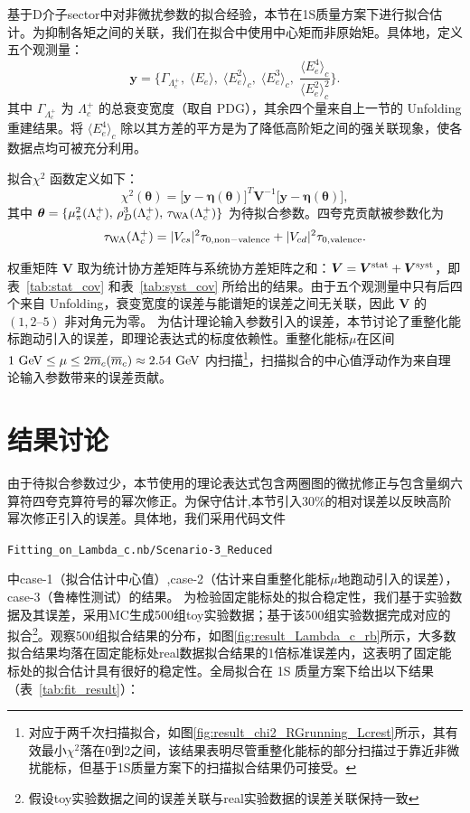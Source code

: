 基于D介子sector中对非微扰参数的拟合经验，本节在1S质量方案下进行拟合估计。为抑制各矩之间的关联，我们在拟合中使用中心矩而非原始矩。具体地，定义五个观测量：
\begin{equation}
\boldsymbol{y} = \Big\{ \Gamma_{\Lambda_c^+},\; \langle E_e\rangle,\; \langle E_e^2\rangle_c,\; \langle E_e^3\rangle_c,\; \frac{\langle E_e^4\rangle_c}{\langle E_e^2\rangle_c^2} \Big\} .
\end{equation}
其中 $\Gamma_{\Lambda_c^+}$ 为 $\Lambda_c^+$ 的总衰变宽度（取自 PDG），其余四个量来自上一节的 Unfolding 重建结果。将 $\langle E_e^4\rangle_c$ 除以其方差的平方是为了降低高阶矩之间的强关联现象，使各数据点均可被充分利用。


拟合$\chi^2$ 函数定义如下：
\begin{equation}\label{eq:chi2}
\chi^2(\boldsymbol{\theta}) = \bigl[\boldsymbol{y} - \boldsymbol{\eta}(\boldsymbol{\theta})\bigr]^T \boldsymbol{V}^{-1} \bigl[\boldsymbol{y} - \boldsymbol{\eta}(\boldsymbol{\theta})\bigr] ,
\end{equation}
其中 $\boldsymbol{\theta} = \{\mu_\pi^2(\Lambda_c^+),\, \rho_D^3(\Lambda_c^+),\, \tau_{\rm WA}(\Lambda_c^+)\}$ 为待拟合参数。四夸克贡献被参数化为
\begin{equation}
\tau_{\rm WA}(\Lambda_c^+) = |V_{cs}|^2 \tau_{0,\rm non-valence} + |V_{cd}|^2 \tau_{0,\rm valence} .
\end{equation}

权重矩阵 $\boldsymbol{V}$ 取为统计协方差矩阵与系统协方差矩阵之和：$\boldsymbol{V} = \boldsymbol{V}^{\rm stat} + \boldsymbol{V}^{\rm syst}$，即表~\ref{tab:stat_cov} 和表~\ref{tab:syst_cov} 所给出的结果。由于五个观测量中只有后四个来自 Unfolding，衰变宽度的误差与能谱矩的误差之间无关联，因此 $\boldsymbol{V}$ 的 $(1,2\text{--}5)$ 非对角元为零。
为估计理论输入参数引入的误差，本节讨论了重整化能标跑动引入的误差，即理论表达式的标度依赖性。重整化能标$\mu$在区间 $1~\mathrm{GeV} \le \mu \le 2\overline{m}_c(\overline{m}_c) \approx 2.54~\mathrm{GeV}$ 内扫描\footnote{对应于两千次扫描拟合，如图\ref{fig:result_chi2_RGrunning_Lcrest}所示，其有效最小$\chi^2$落在0到2之间，该结果表明尽管重整化能标的部分扫描过于靠近非微扰能标，但基于1S质量方案下的扫描拟合结果仍可接受。}，扫描拟合的中心值浮动作为来自理论输入参数带来的误差贡献。
\section{结果讨论}\label{sec:discussion}
由于待拟合参数过少，本节使用的理论表达式包含两圈图的微扰修正与包含量纲六算符四夸克算符号的幂次修正。为保守估计,本节引入$30\%$的相对误差以反映高阶幂次修正引入的误差。具体地，我们采用代码文件
\begin{center}
    \verb|Fitting_on_Lambda_c.nb/Scenario-3_Reduced|
\end{center}
中case-1（拟合估计中心值）,case-2（估计来自重整化能标$\mu$地跑动引入的误差），case-3（鲁棒性测试）的结果。 为检验固定能标处的拟合稳定性，我们基于实验数据及其误差，采用MC生成500组toy实验数据；基于该500组实验数据完成对应的拟合\footnote{假设toy实验数据之间的误差关联与real实验数据的误差关联保持一致}。观察500组拟合结果的分布，如图\ref{fig:result_Lambda_c_rb}所示，大多数拟合结果均落在固定能标处real数据拟合结果的1倍标准误差内，这表明了固定能标处的拟合估计具有很好的稳定性。全局拟合在 1S 质量方案下给出以下结果（表~\ref{tab:fit_result}）：

